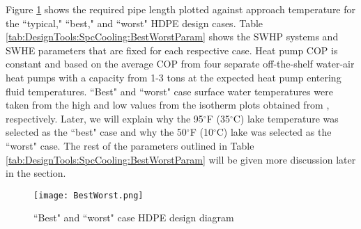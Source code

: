 Figure \ref{fig:DesignTools:SpcCooling:BestWorst} shows the required pipe length plotted against approach temperature for the ``typical," ``best," and ``worst" HDPE design cases. Table \ref{tab:DesignTools:SpcCooling:BestWorstParam} shows the SWHP systems and SWHE parameters that are fixed for each respective case. Heat pump COP is constant and based on the average COP from four separate off-the-shelf water-air heat pumps with a capacity from 1-3 tons at the expected heat pump entering fluid temperatures. ``Best" and ``worst" case surface water temperatures were taken from the high and low values from the isotherm plots obtained from \cite{Selvakumar2013}, respectively. Later, we will explain why the 95$^\circ$F (35$^\circ$C) lake temperature was selected as the ``best" case and why the 50$^\circ$F (10$^\circ$C) lake was selected as the ``worst" case. The rest of the parameters outlined in Table \ref{tab:DesignTools:SpcCooling:BestWorstParam} will be given more discussion later in the section.

	\begin{figure}
		\centering
		\texttt{[image: BestWorst.png]}
		\caption{``Best" and ``worst" case HDPE design diagram}
		\label{fig:DesignTools:SpcCooling:BestWorst}
	\end{figure}

